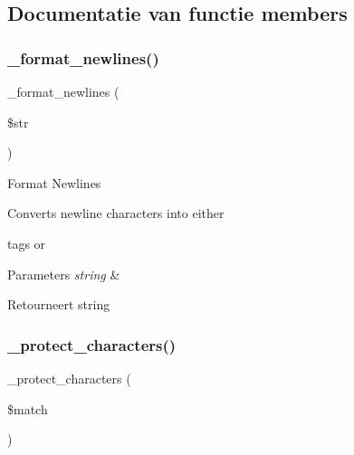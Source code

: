 \subsection{Documentatie van functie members}
\mbox{\label{class_c_i___typography_ac3384cbfc88fcd17e40624bdd6002801}} 
\subsubsection{\texorpdfstring{\_format\_newlines()}{\_format\_newlines()}}
{\footnotesize\ttfamily \+\_\+format\+\_\+newlines (\begin{DoxyParamCaption}\item[{}]{\$str }\end{DoxyParamCaption})\hspace{0.3cm}{\ttfamily [protected]}}

Format Newlines

Converts newline characters into either 

tags or ~\newline



\begin{DoxyParams}{Parameters}
{\em string} & \\
\hline
\end{DoxyParams}
\begin{DoxyReturn}{Retourneert}
string 
\end{DoxyReturn}
\mbox{\label{class_c_i___typography_a03e8f97de4301e0fe0cf0e9f0bcd936c}} 
\subsubsection{\texorpdfstring{\_protect\_characters()}{\_protect\_characters()}}
{\footnotesize\ttfamily \+\_\+protect\+\_\+characters (\begin{DoxyParamCaption}\item[{}]{\$match }\end{DoxyParamCaption})\hspace{0.3cm}{\ttfamily [protected]}}

